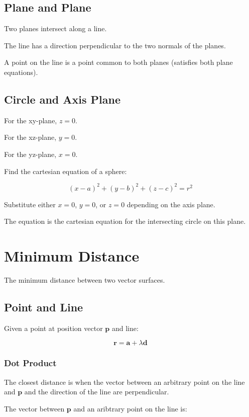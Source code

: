\documentclass[a4paper,11pt]{article}
\newcommand{\bb}{\boldsymbol}
\begin{document}
\subsection{Plane and Plane}

Two planes intersect along a line.

The line has a direction perpendicular to the two normals of the planes.

A point on the line is a point common to both planes (satisfies both plane
equations).


\subsection{Circle and Axis Plane}

For the xy-plane, $z = 0$.

For the xz-plane, $y = 0$.

For the yz-plane, $x = 0$.

Find the cartesian equation of a sphere:

$$
(x - a)^2 + (y - b)^2 + (z - c)^2 = r^2
$$

Substitute either $x = 0$, $y = 0$, or $z = 0$ depending on the axis plane.

The equation is the cartesian equation for the intersecting circle on this
plane.




\section{Minimum Distance}

The minimum distance between two vector surfaces.


\subsection{Point and Line}

Given a point at position vector $\bb{p}$ and line:

$$
\bb{r} = \bb{a} + \lambda \bb{d}
$$


\subsubsection{Dot Product}

The closest distance is when the vector between an arbitrary point on the line
and $\bb{p}$ and the direction of the line are perpendicular.

The vector between $\bb{p}$ and an aribtrary point on the line is:
\end{document}
